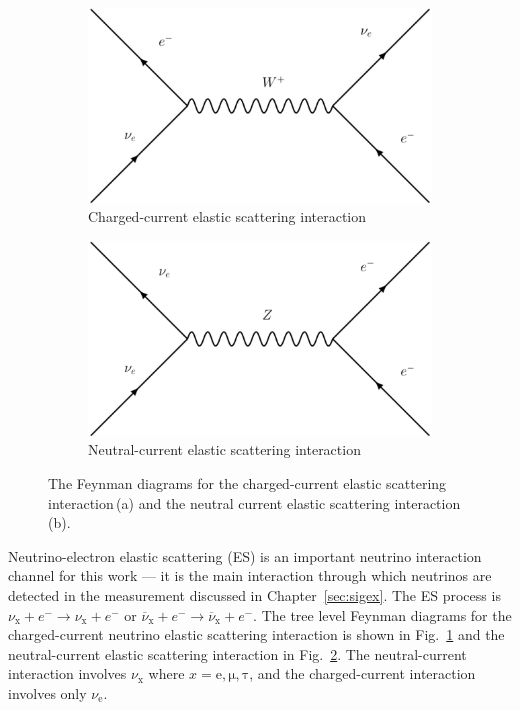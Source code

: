\label{sec:esxsec}
\begin{figure}
\centering
\begin{subfigure}[t]{0.48\textwidth}
\centering
    \includegraphics[width=\textwidth]{cc_es}
    \caption[Charged Current Elastic Scattering Feynman Diagram]{
Charged-current elastic scattering interaction}
\label{fig:ES_CC}
\end{subfigure}
\hfill
\begin{subfigure}[t]{0.48\textwidth}
\centering
    \includegraphics[width=\textwidth]{nc_es}
\caption[Neutral Current Elastic Scattering Feynman Diagram]{
Neutral-current elastic scattering interaction}
\label{fig:ES_NC}
\end{subfigure}
\label{fig:feynman_es}
\caption[Elastic Scattering Feynman Diagrams]{The Feynman diagrams for the
    charged-current elastic scattering interaction\,(a) and the neutral
    current elastic scattering interaction\,(b).}
\end{figure}

Neutrino-electron elastic scattering (ES) is an important neutrino interaction
channel for this work --- it is the main interaction through which neutrinos are
detected in the measurement discussed in Chapter~\ref{sec:sigex}.
The ES process is $\nu_{\mathrm{x}} + e^{-} \rightarrow \nu_{\mathrm{x}} +e^{-}$
or $\overline{\nu}_{\mathrm{x}} + e^{-} \rightarrow \overline{\nu}_{\mathrm{x}} +e^{-}$.
The tree level Feynman diagrams for the charged-current neutrino elastic scattering
interaction is shown in Fig.~\ref{fig:ES_CC} and the neutral-current elastic
scattering interaction in Fig.~\ref{fig:ES_NC}.
The neutral-current interaction involves $\nu_{\mathrm{x}}$ where $x=\mathrm{e, \mu, \tau}$,
and the charged-current interaction involves only $\nu_{\mathrm{e}}$.

